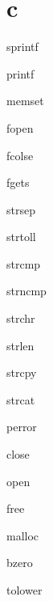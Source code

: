 \documentclass{article} %
\begin{document}
\section{c}
    sprintf\par
    printf\par
    memset\par
    fopen\par
    fcolse\par
    fgets\par
    strsep\par
    strtoll\par
    strcmp\par
    strncmp\par
    strchr\par
    strlen\par
    strcpy\par
    strcat\par
    perror\par
    close\par
    open\par
    free\par
    malloc\par
    bzero\par
    tolower\par
\end{document}
